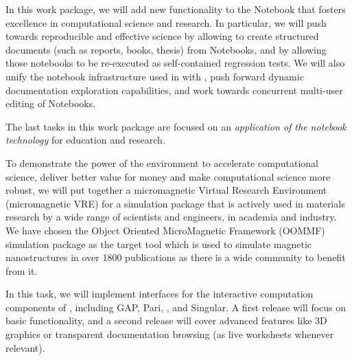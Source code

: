 \begin{workpackage}
\begin{wpdescription}
  In this work package, we will add new functionality to the \Jupyter
  Notebook that fosters excellence in computational science and
  research. In particular, we will push towards reproducible and
  effective science by allowing to create structured documents (such
  as reports, books, thesis) from Notebooks, and by allowing those
  notebooks to be re-executed as self-contained regression tests. We
  will also unify the notebook infrastructure used in \Sage with
  \Jupyter, push forward dynamic documentation exploration
  capabilities, and work towards concurrent multi-user editing of
  Notebooks.

  The last tasks in this work package are focused on an
  \emph{application of the \Jupyter notebook technology} for education
  and research.


To demonstrate the power of the \TheProject environment to accelerate
computational science, deliver better value for money and make
computational science more robust, we will put together a micromagnetic
Virtual Research Environment (micromagnetic VRE) for a simulation
package that is actively used in materials research by a wide range of
scientists and engineers, in academia and industry. We have chosen the
Object Oriented MicroMagnetic Framework (OOMMF) simulation package
\cite{OOMMF-url} as the target tool which is used to simulate magnetic
nanostructures in over 1800 publications \cite{OOMMF-citations-url} as
there is a wide community to benefit from it.
\label{page:description-of-micromagnetic-vre}

\end{wpdescription}

\begin{tasklist}
\begin{task}[title=Uniform notebook interface for all interactive components,id=ipython-kernels,lead=PS]
  In this task, we will implement \Jupyter interfaces for the
  interactive computation components of \TheProject, including GAP,
  Pari, \Sage, and Singular. A first release
   will focus on basic functionality,
  and a second release  will cover advanced
  features like 3D graphics or transparent documentation browsing (as
  live worksheets whenever relevant).



\end{task}
\end{tasklist}
\end{workpackage}
